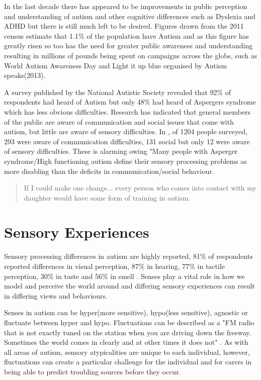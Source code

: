 In the last decade there has appeared to be improvements in public perception and understanding of autism and other cognitive differences such as Dyslexia and ADHD but there is still much left to be desired. Figures drawn from the 2011 census estimate that 1.1\% of the population have Autism\cite{nas} and as this figure has greatly risen\cite{increasingprevalence} so too has the need for greater public awareness and understanding\cite{autism_awareness} resulting in millions of pounds being spent on campaigns across the globs, such as World Autism Awareness Day and Light it up blue organised by Autism speaks(2013)\cite{autism_awareness}. 

A survey published by the National Autistic Society revealed that 92\% of respondents had heard of Autism but only 48\% had heard of Aspergers syndrome which has less obvious difficulties. Research has indicated that general members of the public are aware of communication and social issues that come with autism\cite{autismmisconception}, but little are aware of sensory difficulties\cite{autism_awareness}. In \cite{autism_awareness}, of 1204 people surveyed, 293 were aware of communication difficulties, 131 social but only 12 were aware of sensory difficulties. These is alarming owing "Many people with Asperger syndrome/High functioning autism define their sensory processing problems as more disabling than the deficits in communication/social behaviour\cite{olgab}.

\begin{quote}
If I could make one change... every person who comes into contact with my daughter would have some form of training in autism.\cite{nasschool}
\end{quote}

\section{Sensory Experiences}
Sensory processing differences in autism are highly reported, 81\% of respondents reported differences in visual perception, 87\% in hearing, 77\% in tactile perception, 30\% in taste and 56\% in smell \cite{sensory_leisure}. Senses play a vital role in how we model and perceive the world around and differing sensory experiences can result in differing views and behaviours.
 
Senses in autism can be hyper(more sensitive), hypo(less sensitive), agnostic or fluctuate between hyper and hypo\cite{bayes}. Fluctuations can be described as a "FM radio that is not exactly tuned on the station when you are driving down the freeway. Sometimes the world comes in clearly and at other times it does not" \cite{olgab}. As with all areas of autism, sensory atypicalities are unique to each individual, however, fluctuations can create a particular challenge for the individual and for carers in being able to predict troubling sources before they occur. 


